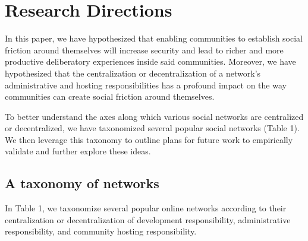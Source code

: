 \documentclass[sigconf,authordraft]{acmart}
\begin{document}



\section{Research Directions}

In this paper, we have hypothesized that enabling communities to establish social friction around themselves will increase security and lead to richer and more productive deliberatory experiences inside said communities. Moreover, we have hypothesized that the centralization or decentralization of a network's administrative and hosting responsibilities has a profound impact on the way communities can create social friction around themselves. 

To better understand the axes along which various social networks are centralized or decentralized, we have taxonomized several popular social networks (Table 1). We then leverage this taxonomy to outline plans for future work to empirically validate and further explore these ideas.

\subsection{A taxonomy of networks}

In Table 1, we taxonomize several popular online networks according to their centralization or decentralization of development responsibility, administrative responsibility, and community hosting responsibility.
\end{document}

